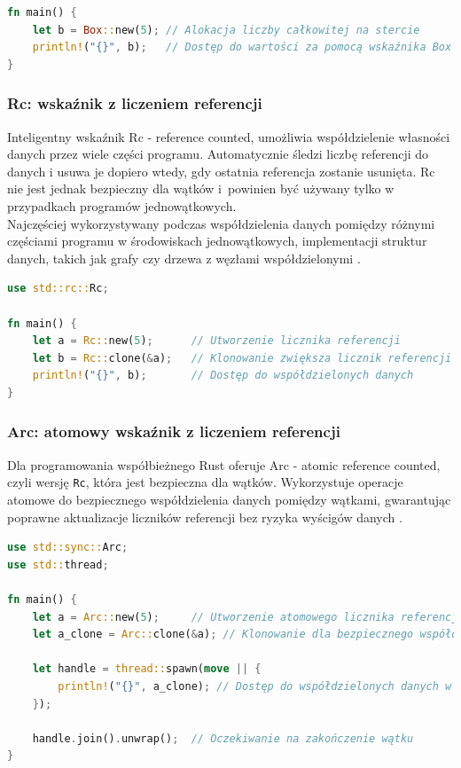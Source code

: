 \begin{lstlisting}[language=Rust, caption=Inteligentny wskaźnik Box, label=box_smart_pointer]
fn main() {
    let b = Box::new(5); // Alokacja liczby całkowitej na stercie
    println!("{}", b);   // Dostęp do wartości za pomocą wskaźnika Box
}
\end{lstlisting}

\subsubsection{Rc: wskaźnik z liczeniem referencji}
\label{RC}
Inteligentny wskaźnik Rc - reference counted, umożliwia współdzielenie własności danych przez wiele części programu. Automatycznie śledzi liczbę referencji do danych i usuwa je dopiero wtedy, gdy ostatnia referencja zostanie usunięta. Rc nie jest jednak bezpieczny dla wątków i~powinien być używany tylko w przypadkach programów jednowątkowych.\\
Najczęściej wykorzystywany podczas współdzielenia danych pomiędzy różnymi częściami programu w środowiskach jednowątkowych, implementacji struktur danych, takich jak grafy czy drzewa z węzłami współdzielonymi \cite{TheRustProgrammingLanguage}.

\begin{lstlisting}[language=Rust, caption=Inteligentny wskaźnik RC, label=rc_smart_pointer]
use std::rc::Rc;

fn main() {
    let a = Rc::new(5);      // Utworzenie licznika referencji
    let b = Rc::clone(&a);   // Klonowanie zwiększa licznik referencji
    println!("{}", b);       // Dostęp do współdzielonych danych
}
\end{lstlisting}

\subsubsection{Arc: atomowy wskaźnik z liczeniem referencji}
\label{ARC}
Dla programowania współbieżnego Rust oferuje Arc - atomic reference counted, czyli wersję \texttt{Rc}, która jest bezpieczna dla wątków. Wykorzystuje operacje atomowe do bezpiecznego współdzielenia danych pomiędzy wątkami, gwarantując poprawne aktualizacje liczników referencji bez ryzyka wyścigów danych \cite{TheRustProgrammingLanguage}.

\begin{lstlisting}[language=Rust, caption=Inteligentny wskaźnik Arc, label=arc_smart_pointer]
use std::sync::Arc;
use std::thread;

fn main() {
    let a = Arc::new(5);     // Utworzenie atomowego licznika referencji
    let a_clone = Arc::clone(&a); // Klonowanie dla bezpiecznego współdzielenia

    let handle = thread::spawn(move || {
        println!("{}", a_clone); // Dostęp do współdzielonych danych w nowym wątku
    });

    handle.join().unwrap();  // Oczekiwanie na zakończenie wątku
}
\end{lstlisting}
